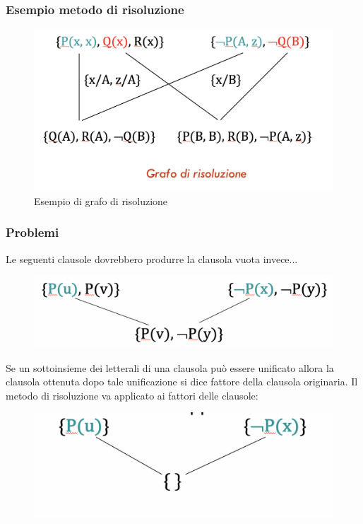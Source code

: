 \documentclass{article}
\begin{document}
\subsubsection{Esempio metodo di risoluzione}
\begin{figure}[h!]
\centering
\includegraphics[scale=0.3]{Images/FOLresexample.png}
\caption{Esempio di grafo di risoluzione}
\end{figure}

\subsubsection{Problemi}
Le seguenti clausole dovrebbero produrre la clausola vuota invece...\newline
\begin{figure}[H]
\centering
\includegraphics[scale=0.3]{Images/problem_a.png}
\end{figure}
Se un sottoinsieme dei letterali di una clausola può essere unificato allora la clausola ottenuta dopo tale unificazione si dice fattore della clausola originaria.\newline
Il metodo di risoluzione va applicato ai fattori delle clausole:
\begin{figure}[H]
\centering
\includegraphics[scale=0.3]{Images/problem_b.png}
\end{figure}
\end{document}
